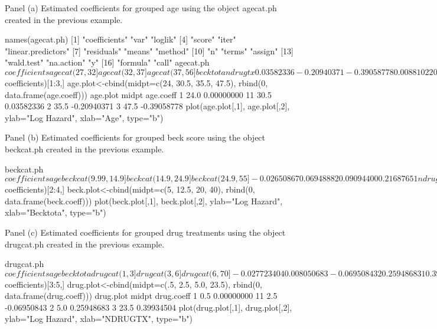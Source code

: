 Panel (a) Estimated coefficients for grouped age using the object agecat.ph created in the previous example.

names(agecat.ph)
 [1] "coefficients"      "var"               "loglik"           
 [4] "score"             "iter"              "linear.predictors"
 [7] "residuals"         "means"             "method"           
[10] "n"                 "terms"             "assign"           
[13] "wald.test"         "na.action"         "y"                
[16] "formula"           "call"             
agecat.ph$coefficients
agecat(27,32] agecat(32,37] agecat(37,56]      becktota       ndrugtx 
   0.03582336   -0.20940371   -0.39058778    0.00881022    0.02919603 
    ivhx3TRUE          site          race         treat 
   0.24241703   -0.07910672   -0.24548561   -0.22934666 
age.coeff<-data.frame(agecat.ph$coefficients)[1:3,]
age.plot<-cbind(midpt=c(24, 30.5, 35.5, 47.5), rbind(0, data.frame(age.coeff)))
age.plot
   midpt   age.coeff
1   24.0  0.00000000
11  30.5  0.03582336
2   35.5 -0.20940371
3   47.5 -0.39058778
plot(age.plot[,1], age.plot[,2], ylab="Log Hazard", xlab="Age", type="b")


Panel (b) Estimated coefficients for grouped beck score using the object beckcat.ph created in the previous example.

beckcat.ph$coefficients
               age beckcat(9.99,14.9] beckcat(14.9,24.9]   beckcat(24.9,55] 
       -0.02650867         0.06948882         0.09094400         0.21687651 
           ndrugtx          ivhx3TRUE               site               race 
        0.02894029         0.26163192        -0.09197744        -0.22540640 
             treat 
       -0.23038130 
beck.coeff<-data.frame(beckcat.ph$coefficients)[2:4,]
beck.plot<-cbind(midpt=c(5, 12.5, 20, 40), rbind(0, data.frame(beck.coeff)))
plot(beck.plot[,1], beck.plot[,2], ylab="Log Hazard", xlab="Becktota", type="b")


Panel (c) Estimated coefficients for grouped drug treatments using the object drugcat.ph created in the previous example.

drugcat.ph$coefficients
          age      becktota  drugcat(1,3]  drugcat(3,6] drugcat(6,70] 
 -0.027723404   0.008050683  -0.069508432   0.259486831   0.399345037 
    ivhx3TRUE          site          race         treat 
  0.249076482  -0.083840409  -0.229664884  -0.219909556 
drug.coeff<-data.frame(drugcat.ph$coefficients)[3:5,]
drug.plot<-cbind(midpt=c(.5, 2.5, 5.0, 23.5), rbind(0, data.frame(drug.coeff)))
drug.plot
   midpt  drug.coeff
1    0.5  0.00000000
11   2.5 -0.06950843
2    5.0  0.25948683
3   23.5  0.39934504
plot(drug.plot[,1], drug.plot[,2], ylab="Log Hazard", xlab="NDRUGTX", type="b")


